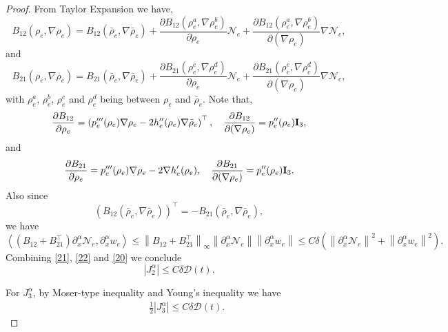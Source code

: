 \documentclass[reqno,twoside,12pt,a4paper]{amsart}
\newcommand{\al}{\alpha}
\newcommand{\pa}{\partial}
\numberwithin{equation}{section}
\begin{document}
\begin{proof}
From Taylor Expansion we have,
\begin{equation*}
    B_{12}(\rho_e,\nabla\rho_e)=B_{12}(\bar{\rho}_e,\nabla \bar{\rho}_e)+\frac{\partial B_{12}(\rho_e^a,\nabla \rho_e^b)}{\partial \rho_e}\mathcal{N}_e+\frac{\partial B_{12}(\rho_e^a,\nabla \rho_e^b)}{\partial (\nabla \rho_e)}\nabla \mathcal{N}_e,
\end{equation*}
and
\begin{equation*}
    B_{21}(\rho_e,\nabla\rho_e)=B_{21}(\bar{\rho}_e,\nabla \bar{\rho}_e)+\frac{\partial B_{21}(\rho_e^c,\nabla \rho_e^d)}{\partial \rho_e}\mathcal{N}_e+\frac{\partial B_{21}(\rho_e^c,\nabla \rho_e^d)}{\partial (\nabla \rho_e)}\nabla \mathcal{N}_e,
\end{equation*}
with $\rho_e^a$, $\rho_e^b$, $\rho_e^c$ and $\rho_e^d$ being between $\rho_e$ and $\bar{\rho}_e$.
Note that,
\begin{equation*}
\frac{\partial B_{12}}{\partial \rho_e}=\left( p_e'''(\rho_e)\nabla \rho_e-2h''_e(\rho_e) \nabla \bar{\rho}_e \right )^\top,\quad 
\frac{\partial B_{12}}{\partial (\nabla \rho_e)}=p_e''(\rho_e){\bf{I}}_3,
\end{equation*}
and
\begin{equation*}
\frac{\partial B_{21}}{\partial \rho_e}= p_e'''(\rho_e)\nabla \rho_e-2\nabla h'_e(\rho_e),\quad 
\frac{\partial B_{21}}{\partial (\nabla \rho_e)}=p_e''(\rho_e){\bf{I}}_3.
\end{equation*}
Also since
\begin{equation*}
    \left (B_{12}(\bar{\rho}_e,\nabla \bar{\rho}_e) \right)^\top=-B_{21}(\bar{\rho}_e,\nabla \bar{\rho}_e),
\end{equation*}
we have
\begin{equation}\label{20}
    \left< (B_{12}+B_{21}^\top) \pa_x^\al\mathcal{N}_e ,\pa_x^\al w_e \right> \leq \left\|B_{12}+B_{21}^\top \right\|_\infty \left\|\pa_x^\al \mathcal{N}_e\right\| \left\|\pa_x^\al w_e\right\| \leq C\delta \left (\left\|\pa_x^\al \mathcal{N}_e\right\|^2+\left\|\pa_x^\al w_e\right\|^2 \right).
\end{equation}
Combining \eqref{21}, \eqref{22} and \eqref{20} we conclude
\begin{equation}\label{23}
    |J_2^\alpha| \leq C\delta \mathcal{D}(t).
\end{equation}

For $J_3^\alpha$, by Moser-type inequality and Young's inequality we have
\begin{eqnarray}\label{24}
        &&\frac{1}{2}|J_3^\alpha| \nonumber \leq C\delta \mathcal{D}(t).
\end{eqnarray}


\end{proof}
\end{document}
